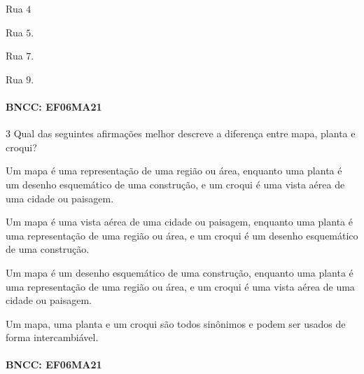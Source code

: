 \begin{escolha}
\item Rua $4$
\item Rua $5$.
\item Rua $7$.
\item Rua $9$.
\end{escolha}

\paragraph{BNCC: EF06MA21 }


\num{3}  Qual das seguintes afirmações melhor descreve a diferença entre mapa,
planta e croqui?

\begin{escolha}
\item
  Um mapa é uma representação de uma região ou área, enquanto uma planta
  é um desenho esquemático de uma construção, e um croqui é uma vista
  aérea de uma cidade ou paisagem.
\item
  Um mapa é uma vista aérea de uma cidade ou paisagem, enquanto uma
  planta é uma representação de uma região ou área, e um croqui é um
  desenho esquemático de uma construção.
\item
  Um mapa é um desenho esquemático de uma construção, enquanto uma
  planta é uma representação de uma região ou área, e um croqui é uma
  vista aérea de uma cidade ou paisagem.
\item
  Um mapa, uma planta e um croqui são todos sinônimos e podem ser usados
  de forma intercambiável.
\end{escolha}


\paragraph{BNCC: EF06MA21 }

